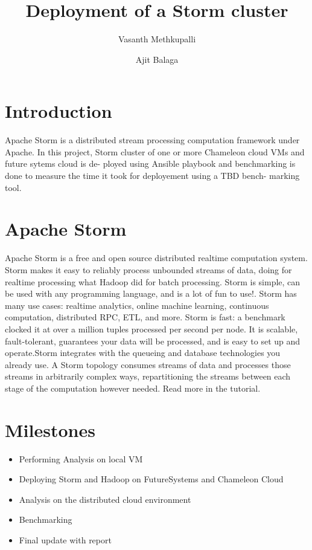 \documentclass[9pt,twocolumn,twoside]{../../styles/osajnl}
\title{Deployment of a Storm cluster}
\author[1,*]{Vasanth Methkupalli}
\author[1,**]{Ajit Balaga}
\affil[1]{School of Informatics and Computing, Bloomington, IN 47408, U.S.A.}
\affil[*]{Corresponding authors:mvasanthiiit@gmail.com}
\affil[**]{Corresponding authors: ajit.balaga@gmail.com}
\begin{document}
\maketitle



\section{Introduction}
Apache Storm is a distributed stream processing computation framework
under Apache. In this project, Storm cluster of one or more Chameleon
cloud VMs and future sytems cloud is de- ployed using Ansible playbook
and benchmarking is done to measure the time it took for deployement
using a TBD bench- marking tool\cite{www-apache1}\cite{www-storm-zookeeper}.


\section{Apache Storm}

Apache Storm is a free and open source distributed realtime
computation system. Storm makes it easy to reliably process unbounded
streams of data, doing for realtime processing what Hadoop did for
batch processing. Storm is simple, can be used with any programming
language, and is a lot of fun to use!. Storm has many use cases:
realtime analytics, online machine learning, continuous computation,
distributed RPC, ETL, and more. Storm is fast: a benchmark clocked it
at over a million tuples processed per second per node. It is
scalable, fault-tolerant, guarantees your data will be processed, and
is easy to set up and operate.Storm integrates with the queueing and
database technologies you already use. A Storm topology consumes
streams of data and processes those streams in arbitrarily complex
ways, repartitioning the streams between each stage of the computation
however needed. Read more in the tutorial\cite{www-apache1}\cite{www-wiki-storm}.


\section{Milestones}

\begin{itemize}
\item Performing Analysis on local VM
\item Deploying Storm and Hadoop on FutureSystems and Chameleon Cloud
\item Analysis on the distributed cloud environment
\item Benchmarking
\item Final update with report
\end{itemize}
\end{document}
